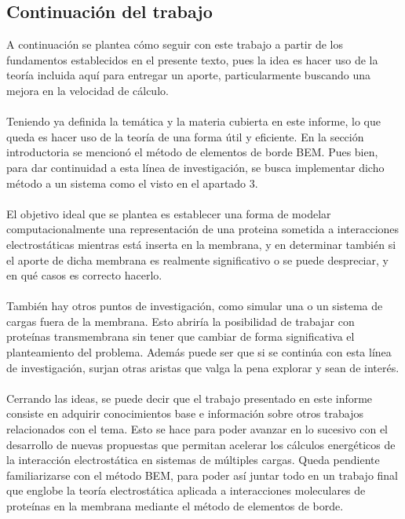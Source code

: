 \documentclass[12pt, notitlepage]{article}
\begin{document}
\subsection{Continuación del trabajo}
A continuación se plantea cómo seguir con este trabajo a partir de los fundamentos establecidos en el presente texto, pues la idea es hacer uso de la teoría incluida aquí para entregar un aporte, particularmente buscando una mejora en la velocidad de cálculo.\\\\
Teniendo ya definida la temática y la materia cubierta en este informe, lo que queda es hacer uso de la teoría de una forma útil y eficiente. En la sección introductoria se mencionó el método de elementos de borde BEM. Pues bien, para dar continuidad a esta línea de investigación, se busca implementar dicho método a un sistema como el visto en el apartado 3.\\\\
El objetivo ideal que se plantea es establecer una forma de modelar computacionalmente una representación de una proteina sometida a interacciones electrostáticas mientras está inserta en la membrana, y en determinar también si el aporte de dicha membrana es realmente significativo o se puede despreciar, y en qué casos es correcto hacerlo.\\\\
También hay otros puntos de investigación, como simular una o un sistema de cargas fuera de la membrana. Esto abriría la posibilidad de trabajar con proteínas transmembrana sin tener que cambiar de forma significativa el planteamiento del problema. Además puede ser que si se continúa con esta línea de investigación, surjan otras aristas que valga la pena explorar y sean de interés.\\\\
Cerrando las ideas, se puede decir que el trabajo presentado en este informe consiste en adquirir conocimientos base e información sobre otros trabajos relacionados con el tema. Esto se hace para poder avanzar en lo sucesivo con el desarrollo de nuevas propuestas que permitan acelerar los cálculos energéticos de la interacción electrostática en sistemas de múltiples cargas. Queda pendiente familiarizarse con el método BEM, para poder así juntar todo en un trabajo final que englobe la teoría electrostática aplicada a interacciones moleculares de proteínas en la membrana mediante el método de elementos de borde.


\pagebreak
\end{document}
